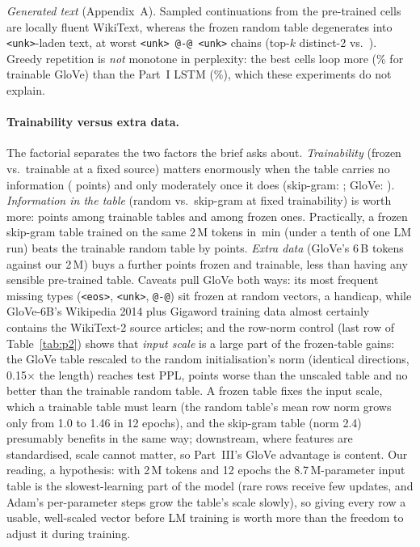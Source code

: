 \documentclass[10pt,a4paper]{article}
\begin{document}
\emph{Generated text} (Appendix~A). Sampled continuations from the pre-trained cells are locally fluent WikiText, whereas the frozen random table degenerates into \texttt{<unk>}-laden text, at worst \texttt{<unk> @-@ <unk>} chains (top-$k$ distinct-2 \distinctTopkLSTMRandFrozen{} vs.\ \distinctTopkLSTMRand). Greedy repetition is \emph{not} monotone in perplexity: the best cells loop more (\repGreedyLSTMGloveTrain\% for trainable GloVe) than the Part~I LSTM (\repGreedyLSTMRand\%), which these experiments do not explain.

\paragraph{Trainability versus extra data.}
The factorial separates the two factors the brief asks about. \emph{Trainability} (frozen vs.\ trainable at a fixed source) matters enormously when the table carries no information (\cRandFrozenVsTrain{} points) and only moderately once it does (skip-gram: \cSkipFrozenVsTrain{}; GloVe: \cGloveFrozenVsTrain). \emph{Information in the table} (random vs.\ skip-gram at fixed trainability) is worth more: \cRandVsSkipTrain{} points among trainable tables and \cRandFrozenVsSkipFrozen{} among frozen ones. Practically, a frozen skip-gram table trained on the same 2\,M tokens in \skipgramMinutes{}\,min (under a tenth of one LM run) beats the trainable random table by \cRandVsSkipFrozen{} points. \emph{Extra data} (GloVe's 6\,B tokens against our 2\,M) buys a further \cSkipVsGloveFrozen{} points frozen and \cSkipVsGloveTrain{} trainable, less than having any sensible pre-trained table. Caveats pull GloVe both ways: its most frequent missing types (\texttt{<eos>}, \texttt{<unk>}, \texttt{@-@}) sit frozen at random vectors, a handicap, while GloVe-6B's Wikipedia 2014 plus Gigaword training data almost certainly contains the WikiText-2 source articles; and the row-norm control (last row of Table~\ref{tab:p2}) shows that \emph{input scale} is a large part of the frozen-table gains: the GloVe table rescaled to the random initialisation's norm (identical directions, 0.15$\times$ the length) reaches \pplLSTMGloveFrozenScaled{} test PPL, \cGloveScaledVsGlove{} points worse than the unscaled table and no better than the trainable random table. A frozen table fixes the input scale, which a trainable table must learn (the random table's mean row norm grows only from 1.0 to 1.46 in 12 epochs), and the skip-gram table (norm 2.4) presumably benefits in the same way; downstream, where features are standardised, scale cannot matter, so Part~III's GloVe advantage is content. Our reading, a hypothesis: with 2\,M tokens and 12 epochs the 8.7\,M-parameter input table is the slowest-learning part of the model (rare rows receive few updates, and Adam's per-parameter steps grow the table's scale slowly), so giving every row a usable, well-scaled vector before LM training is worth more than the freedom to adjust it during training.
\end{document}
